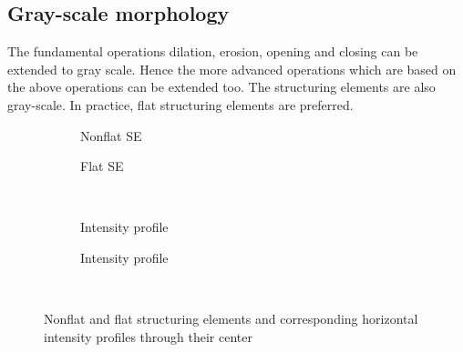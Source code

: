 \subsection{Gray-scale morphology}
The fundamental operations dilation, erosion, opening and closing can be extended to gray scale. Hence the more advanced operations which are based on the above operations can be extended too. The structuring elements are also gray-scale. In practice, flat structuring elements are preferred.

\begin{figure}[h!]
\centering
\begin{subfigure}[b]{0.45\textwidth}
\centering
{}
\caption{Nonflat SE}
\end{subfigure}
\begin{subfigure}[b]{0.45\textwidth}
\centering
{}
\caption{Flat SE}
\end{subfigure}\\
\begin{subfigure}[b]{0.45\textwidth}
\centering
{}
\caption{Intensity profile}
\end{subfigure}
\begin{subfigure}[b]{0.45\textwidth}
\centering
{}
\caption{Intensity profile}
\end{subfigure}\\
\caption{Nonflat and flat structuring elements and corresponding horizontal intensity profiles through their center}
\end{figure}

